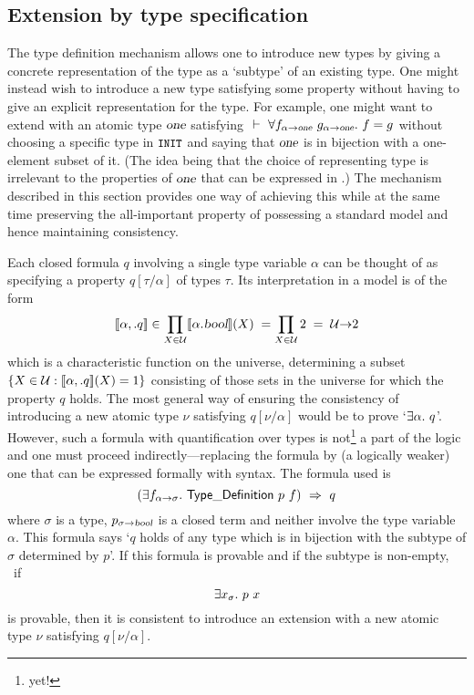 \subsection{Extension by type specification\protect\footnotemark}
\label{tyspecs}
  The type definition
mechanism allows one to introduce new types by giving a concrete
representation of the type as a `subtype' of an existing type. One
might instead wish to introduce a new type satisfying some property
without having to give an explicit representation for the type. For
example, one might want to extend  with an atomic type
$\textsl{one}$ satisfying $\ \vdash\ \forall f_{\alpha{\to}\textsl{one}}\
  g_{\alpha{\to}\textsl{one}}.\ f=g$ without choosing a specific type in
$\hbox{{\small\tt INIT}}$ and saying that $\textsl{one}$ is in bijection with a
one-element subset of it. (The idea being that the choice of
representing type is irrelevant to the properties of $\textsl{one}$ that
can be expressed in \HOL.) The mechanism described in this section
provides one way of achieving this while at the same time preserving
the all-important property of possessing a standard model and hence
maintaining consistency.

Each closed formula $q$ involving a single type variable $\alpha$ can
be thought of as specifying a property $q[\tau/\alpha]$ of types
$\tau$. Its interpretation in a model is of the form
\[
[\![\alpha,.q]\!]\in \prod_{X\in{\cal U}}[\![\alpha.\textsl{bool}]\!](X)
\;= \prod_{X\in{\cal U}}\mbox{\rm 2} \;=\; {\cal U}{\to}\mbox{\rm 2}
\]
which is a characteristic function on the universe, determining a
subset $\{X\in{\cal U}:[\![\alpha,.q]\!](X)=1\}$ consisting of those
sets in the universe for which the property $q$ holds. The most
general way of ensuring the consistency of introducing a new atomic
type $\nu$ satisfying $q[\nu/\alpha]$ would be to prove
`$\exists \alpha.\ q$'. However, such a
formula with quantification over types is not\footnote{yet!} a part of
the \HOL{} logic and one must proceed indirectly---replacing the
formula by (a logically weaker) one that can be expressed formally with
\HOL{} syntax. The formula used is
\[
(\exists f_{\alpha{\to}\sigma}.\ {\sf Type\_Definition}\ p\ f)\ \Rightarrow\ q
\]
where $\sigma$ is a type, $p_{\sigma{\to}\textsl{bool}}$ is a closed term
and neither involve the type variable $\alpha$. This formula says `$q$
holds of any type which is in bijection with the subtype of $\sigma$
determined by $p$'. If this formula is provable and if the subtype is
non-empty, \ie\ if
\[
\exists x_\sigma.\ p\ x
\]
is provable, then it is consistent to introduce an extension with a new
atomic type $\nu$ satisfying $q[\nu/\alpha]$.

